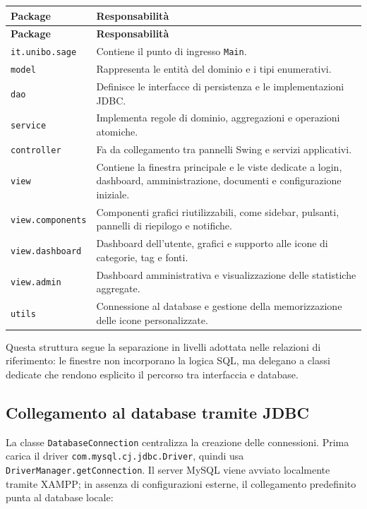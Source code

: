 \documentclass[11pt,a4paper]{article}
\begin{document}
\begin{longtable}{p{4.1cm} p{10.5cm}}
\toprule
\textbf{Package} & \textbf{Responsabilità} \\
\midrule
\endfirsthead
\toprule
\textbf{Package} & \textbf{Responsabilità} \\
\midrule
\endhead
\texttt{it.unibo.sage} & Contiene il punto di ingresso \texttt{Main}. \\
\texttt{model} & Rappresenta le entità del dominio e i tipi enumerativi. \\
\texttt{dao} & Definisce le interfacce di persistenza e le implementazioni JDBC. \\
\texttt{service} & Implementa regole di dominio, aggregazioni e operazioni atomiche. \\
\texttt{controller} & Fa da collegamento tra pannelli Swing e servizi applicativi. \\
\texttt{view} & Contiene la finestra principale e le viste dedicate a login, dashboard, amministrazione, documenti e configurazione iniziale. \\
\texttt{view.components} & Componenti grafici riutilizzabili, come sidebar, pulsanti, pannelli di riepilogo e notifiche. \\
\texttt{view.dashboard} & Dashboard dell'utente, grafici e supporto alle icone di categorie, tag e fonti. \\
\texttt{view.admin} & Dashboard amministrativa e visualizzazione delle statistiche aggregate. \\
\texttt{utils} & Connessione al database e gestione della memorizzazione delle icone personalizzate. \\
\bottomrule
\end{longtable}

Questa struttura segue la separazione in livelli adottata nelle relazioni di riferimento: le finestre non incorporano la logica SQL, ma delegano a classi dedicate che rendono esplicito il percorso tra interfaccia e database.

\subsection{Collegamento al database tramite JDBC}
La classe \texttt{DatabaseConnection} centralizza la creazione delle connessioni. Prima carica il driver \texttt{com.mysql.cj.jdbc.Driver}, quindi usa \texttt{DriverManager.getConnection}. Il server MySQL viene avviato localmente tramite XAMPP; in assenza di configurazioni esterne, il collegamento predefinito punta al database locale:
\end{document}
